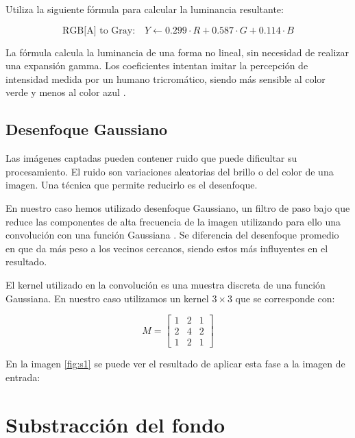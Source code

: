 Utiliza la siguiente fórmula para calcular la luminancia resultante:

\begin{equation*}
    \text{RGB[A] to Gray:} \quad Y \leftarrow 0.299 \cdot R + 0.587 \cdot G + 0.114 \cdot B
\end{equation*}

La fórmula calcula la luminancia de una forma no lineal, sin necesidad
de realizar una expansión gamma. Los coeficientes intentan imitar la
percepción de intensidad medida por un humano tricromático, siendo más
sensible al color verde y menos al color azul \citep{wiki:grayscale}.

\subsection{Desenfoque Gaussiano}\label{desenfoque-gaussiano}

Las imágenes captadas pueden contener ruido que puede dificultar su
procesamiento. El ruido son variaciones aleatorias del brillo o del
color de una imagen. Una técnica que permite reducirlo es el desenfoque.

En nuestro caso hemos utilizado desenfoque Gaussiano, un filtro de paso
bajo que reduce las componentes de alta frecuencia de la imagen
utilizando para ello una convolución con una función Gaussiana
\citep{wiki:gaussian}. Se diferencia del desenfoque promedio en que da
más peso a los vecinos cercanos, siendo estos más influyentes en el
resultado.

El kernel utilizado en la convolución es una muestra discreta de una
función Gaussiana. En nuestro caso utilizamos un kernel $3 \times 3$ que se
corresponde con: \citep{book:mastering_opencv}

\begin{equation*}
    M = 
    \begin{bmatrix}
    1 & 2 & 1 \\[0.3em] 
    2 & 4 & 2 \\[0.3em] 
    1 & 2 & 1
    \end{bmatrix}
\end{equation*}

En la imagen \ref{fig:s1} se puede ver el resultado de aplicar esta fase a
la imagen de entrada:


\section{Substracción del fondo}\label{substraccion-del-fondo}

